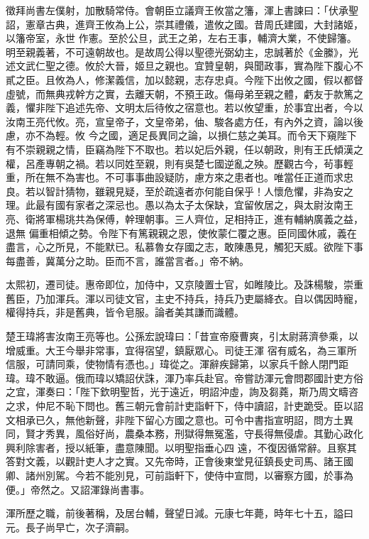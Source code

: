 \begin{pinyinscope}
 徵拜尚書左僕射，加散騎常侍。會朝臣立議齊王攸當之籓，渾上書諫曰：「伏承聖詔，憲章古典，進齊王攸為上公，崇其禮儀，遣攸之國。昔周氏建國，大封諸姬，以籓帝室，永世
 作憲。至於公旦，武王之弟，左右王事，輔濟大業，不使歸籓。明至親義著，不可遠朝故也。是故周公得以聖德光弼幼主，忠誠著於《金縢》，光述文武仁聖之德。攸於大晉，姬旦之親也。宜贊皇朝，與聞政事，實為陛下腹心不貳之臣。且攸為人，修潔義信，加以懿親，志存忠貞。今陛下出攸之國，假以都督虛號，而無典戎幹方之實，去離天朝，不預王政。傷母弟至親之體，虧友于款篤之義，懼非陛下追述先帝、文明太后待攸之宿意也。若以攸望重，於事宜出者，今以汝南王亮代攸。亮，宣皇帝子，文皇帝弟，伷、駿各處方任，有內外之資，論以後慮，亦不為輕。攸
 今之國，適足長異同之論，以損仁慈之美耳。而令天下窺陛下有不崇親親之情，臣竊為陛下不取也。若以妃后外親，任以朝政，則有王氏傾漢之權，呂產專朝之禍。若以同姓至親，則有吳楚七國逆亂之殃。歷觀古今，茍事輕重，所在無不為害也。不可事事曲設疑防，慮方來之患者也。唯當任正道而求忠良。若以智計猜物，雖親見疑，至於疏遠者亦何能自保乎！人懷危懼，非為安之理。此最有國有家者之深忌也。愚以為太子太保缺，宜留攸居之，與太尉汝南王亮、衛將軍楊珧共為保傅，幹理朝事。三人齊位，足相持正，進有輔納廣義之益，退無
 偏重相傾之勢。令陛下有篤親親之恩，使攸蒙仁覆之惠。臣同國休戚，義在盡言，心之所見，不能默已。私慕魯女存國之志，敢陳愚見，觸犯天威。欲陛下事每盡善，冀萬分之助。臣而不言，誰當言者。」帝不納。



 太熙初，遷司徒。惠帝即位，加侍中，又京陵置士官，如睢陵比。及誅楊駿，崇重舊臣，乃加渾兵。渾以司徒文官，主史不持兵，持兵乃吏屬絳衣。自以偶因時寵，權得持兵，非是舊典，皆令皂服。論者美其謙而識體。



 楚王瑋將害汝南王亮等也。公孫宏說瑋曰：「昔宣帝廢曹爽，引太尉蔣濟參乘，以增威重。大王今舉非常事，宜得宿望，鎮厭眾心。司徒王渾
 宿有威名，為三軍所信服，可請同乘，使物情有憑也。」瑋從之。渾辭疾歸第，以家兵千餘人閉門距瑋。瑋不敢逼。俄而瑋以矯詔伏誅，渾乃率兵赴官。帝嘗訪渾元會問郡國計吏方俗之宜，渾奏曰：「陛下欽明聖哲，光于遠近，明詔沖虛，詢及芻蕘，斯乃周文疇咨之求，仲尼不恥下問也。舊三朝元會前計吏詣軒下，侍中讀詔，計吏跪受。臣以詔文相承已久，無他新聲，非陛下留心方國之意也。可令中書指宣明詔，問方土異同，賢才秀異，風俗好尚，農桑本務，刑獄得無冤濫，守長得無侵虐。其勤心政化興利除害者，授以紙筆，盡意陳聞。以明聖指垂心四
 遠，不復因循常辭。且察其答對文義，以觀計吏人才之實。又先帝時，正會後東堂見征鎮長史司馬、諸王國卿、諸州別駕。今若不能別見，可前詣軒下，使侍中宣問，以審察方國，於事為便。」帝然之。又詔渾錄尚書事。



 渾所歷之職，前後著稱，及居台輔，聲望日減。元康七年薨，時年七十五，謚曰元。長子尚早亡，次子濟嗣。




\end{pinyinscope}
